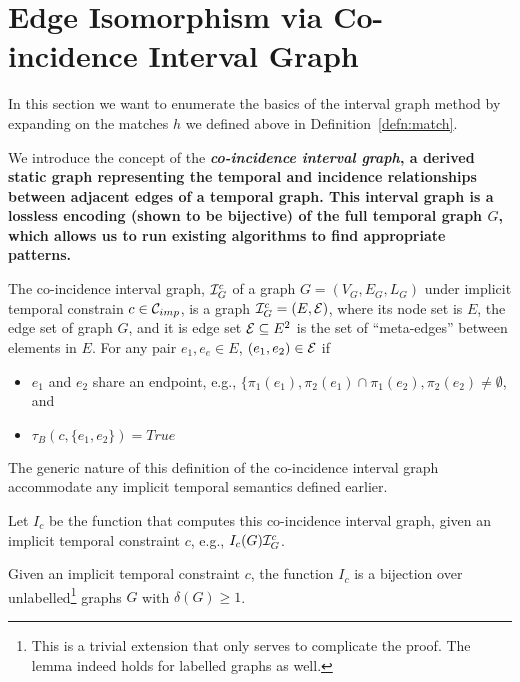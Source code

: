 \section{Edge Isomorphism via Co-incidence Interval Graph}

In this section we want to enumerate the basics of the interval graph method by
expanding on the matches $h$ we defined above in Definition~\ref{defn:match}. 

We introduce the concept of the {\bf {\em co-incidence interval graph}, a
  derived static graph representing the temporal and incidence relationships
  between adjacent edges of a temporal graph. This interval graph is a lossless
  encoding (shown to be bijective) of the full temporal graph $G$, which allows
  us to run existing algorithms to find appropriate patterns.}

\begin{defn}
  \label{def:ci_graph}
  The co-incidence interval graph, $\mathcal{I}_G^c$ of a graph $G = (V_G,E_G, L_G)$ under
  implicit temporal constrain $c \in \mathcal{C}_{imp}$, is a graph $\mathcal{I}_G^c = (E, \mathcal{E})$, where its 
  node set is $E$,  the edge set of  graph $G$,  and it is edge set $\mathcal{E} \subseteq E^2$ is
  the set of ``meta-edges'' between elements in $E$. For any pair $e_1, e_e \in E$, 
  $(e_1,e_2) \in \mathcal{E}$ if  
  \begin{itemize}
    \item $e_1$ and $e_2$ share an endpoint, e.g., $\{\pi_1(e_1), \pi_2(e_1) 
    	\cap \pi_1(e_2), \pi_2(e_2) \not= \emptyset$,  and
    \item $\tau_B(c,\{e_1,e_2\}) = True$
  \end{itemize}
\end{defn}

The generic nature of this definition of the co-incidence interval graph accommodate any 
implicit temporal semantics defined earlier.



 Let $I_c$ be the function that computes this co-incidence interval graph, given an implicit temporal constraint $c$, e.g., $I_c(G) \mathcal{I}_G^c$.

\begin{lemma}
  \label{lem:ci_biject}
  Given an implicit temporal constraint $c$, the function $I_c$ is a bijection over
  unlabelled\footnote{This is a trivial extension that only serves to complicate the proof. The lemma indeed holds for labelled graphs as well.} graphs $G$ with $\delta(G) \geq 1$.
\end{lemma}

